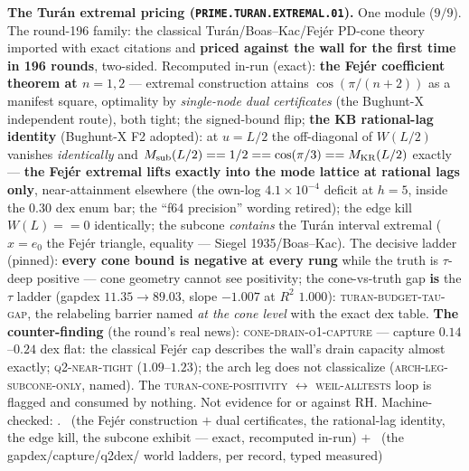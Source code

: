 \par\smallskip\noindent\textbf{The Tur\'an extremal pricing
(\texttt{PRIME.\allowbreak TURAN.\allowbreak EXTREMAL.01}).}
One module ($9/9$).  The round-196 family: the classical
Tur\'an/Boas--Kac/Fej\'er PD-cone theory imported with exact
citations and \textbf{priced against the wall for the first time
in 196 rounds}, two-sided.  Recomputed in-run (exact):
\textbf{the Fej\'er coefficient theorem at $n = 1, 2$} ---
extremal construction attains $\cos(\pi/(n + 2))$ as a manifest
square, optimality by \emph{single-node dual certificates} (the
Bughunt-X independent route), both tight; the signed-bound flip;
\textbf{the KB rational-lag identity} (Bughunt-X F2 adopted): at
$u = L/2$ the off-diagonal of $W(L/2)$ vanishes
\emph{identically} and $M_{\rm sub}(L/2) == 1/2 == \cos(\pi/3) ==
M_{\rm KR}(L/2)$ exactly --- \textbf{the Fej\'er extremal lifts
exactly into the mode lattice at rational lags only},
near-attainment elsewhere (the own-log $4.1\times10^{-4}$ deficit
at $h = 5$, inside the $0.30$ dex enum bar; the ``f64 precision''
wording retired); the edge kill $W(L) == 0$ identically; the
subcone \emph{contains} the Tur\'an interval extremal ($x = e_0$
the Fej\'er triangle, equality --- Siegel 1935/Boas--Kac).  The
decisive ladder (pinned): \textbf{every cone bound is negative at
every rung} while the truth is $\tau$-deep positive --- cone
geometry cannot see positivity; the cone-vs-truth gap \textbf{is}
the $\tau$ ladder (gapdex $11.35 \to 89.03$, slope $-1.007$ at
$R^2$ $1.000$): \textsc{turan-budget-tau-gap}, the relabeling
barrier named \emph{at the cone level} with the exact dex table.
\textbf{The counter-finding} (the round's real news):
\textsc{cone-drain-o1-capture} --- capture $0.14$--$0.24$ dex
flat: the classical Fej\'er cap describes the wall's drain
capacity almost exactly; \textsc{q2-near-tight}
($1.09$--$1.23$); the arch leg does not classicalize
(\textsc{arch-leg-subcone-only}, named).  The
\textsc{turan-cone-positivity} $\leftrightarrow$
\textsc{weil-alltests} loop is flagged and consumed by nothing.
Not evidence for or against RH.
Machine-checked: .
\mE\ (the Fej\'er construction $+$ dual certificates, the
rational-lag identity, the edge kill, the subcone exhibit ---
exact, recomputed in-run) $+$ \mC\ (the gapdex/capture/q2dex/
world ladders, per record, typed measured)
\par\smallskip


